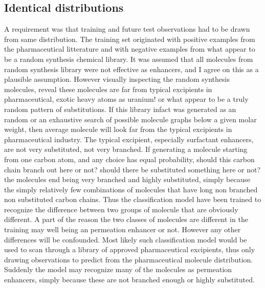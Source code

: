 \subsection{Identical distributions}
A requirement was that training and future test observations had to be drawn from same distribution. The training set originated with positive examples from the pharmaceutical litterature and with negative examples from what appear to be a random synthesis chemical library. It was assumed that all molecules from random synthesis library were not effective as enhancers, and I agree on this as a plausible assumption. However visually inspecting the random synthesis molecules, reveal these molecules are far from typical excipients in pharmaceutical, exotic heavy atoms as uranium! or what appear to be a truly random pattern of substitutions. If this library infact was generated as an random or an exhaustive search of possible molecule graphs below a given molar weight, then average molecule will look far from the typical excipients in pharmaceutical industry. The typical excipient, especially surfactant enhancers, are not very substituted, not very branched. If generating a molecule starting from one carbon atom, and any choice has equal probability, should this carbon chain branch out here or not? should there be substituted something here or not? the molecules end being very branched and highly substituted, simply because the simply relatively few combinations of molecules that have long non branched non substituted carbon chains. Thus the classification model have been trained to recognize the difference between two groups of molecule that are obviously different. A part of the reason the two classes of molecules are different in the training may well being an permeation enhancer or not. However any other differences will be confounded. Most likely such classification model would be used to scan through a library of approved pharmaceutical excipients, thus only drawing observations to predict from the pharmaceutical molecule distribution. Suddenly the model may recognize many of the molecules as permeation enhancers, simply because these are not branched enough or highly substituted.

\subsection{}



\section{}




